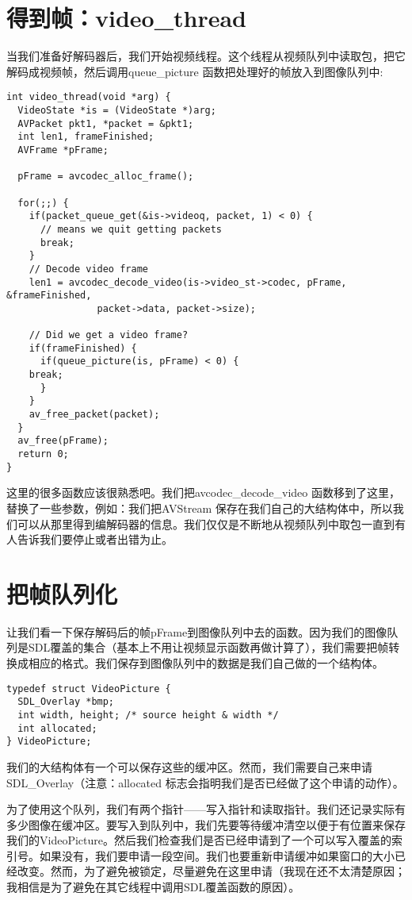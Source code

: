 \section{得到帧：video_thread}
当我们准备好解码器后，我们开始视频线程。这个线程从视频队列中读取包，把它解码成视频帧，然后调用queue_picture 函数把处理好的帧放入到图像队列中:
\begin{lstlisting}
int video_thread(void *arg) {
  VideoState *is = (VideoState *)arg;
  AVPacket pkt1, *packet = &pkt1;
  int len1, frameFinished;
  AVFrame *pFrame;

  pFrame = avcodec_alloc_frame();

  for(;;) {
    if(packet_queue_get(&is->videoq, packet, 1) < 0) {
      // means we quit getting packets
      break;
    }
    // Decode video frame
    len1 = avcodec_decode_video(is->video_st->codec, pFrame, &frameFinished,
                packet->data, packet->size);

    // Did we get a video frame?
    if(frameFinished) {
      if(queue_picture(is, pFrame) < 0) {
    break;
      }
    }
    av_free_packet(packet);
  }
  av_free(pFrame);
  return 0;
}
\end{lstlisting}

这里的很多函数应该很熟悉吧。我们把avcodec_decode_video 函数移到了这里，替换了一些参数，例如：我们把AVStream 保存在我们自己的大结构体中，所以我们可以从那里得到编解码器的信息。我们仅仅是不断地从视频队列中取包一直到有人告诉我们要停止或者出错为止。

\section{把帧队列化}

让我们看一下保存解码后的帧pFrame到图像队列中去的函数。因为我们的图像队列是SDL覆盖的集合（基本上不用让视频显示函数再做计算了），我们需要把帧转换成相应的格式。我们保存到图像队列中的数据是我们自己做的一个结构体。

\begin{lstlisting}
typedef struct VideoPicture {
  SDL_Overlay *bmp;
  int width, height; /* source height & width */
  int allocated;
} VideoPicture;
\end{lstlisting}

我们的大结构体有一个可以保存这些的缓冲区。然而，我们需要自己来申请SDL_Overlay（注意：allocated 标志会指明我们是否已经做了这个申请的动作）。

为了使用这个队列，我们有两个指针——写入指针和读取指针。我们还记录实际有多少图像在缓冲区。要写入到队列中，我们先要等待缓冲清空以便于有位置来保存我们的VideoPicture。然后我们检查我们是否已经申请到了一个可以写入覆盖的索引号。如果没有，我们要申请一段空间。我们也要重新申请缓冲如果窗口的大小已经改变。然而，为了避免被锁定，尽量避免在这里申请（我现在还不太清楚原因；我相信是为了避免在其它线程中调用SDL覆盖函数的原因）。

